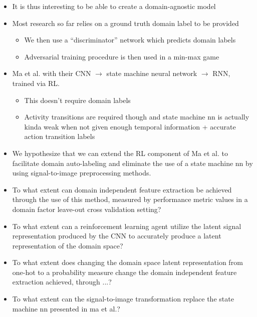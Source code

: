 \begin{itemize}
	\item It is thus interesting to be able to create a domain-agnostic model
	\item Most research so far relies on a ground truth domain label to be provided
	\begin{itemize}
		\item We then use a ``discriminator'' network which predicts domain labels
		\item Adversarial training procedure is then used in a min-max game 
	\end{itemize}
	\item Ma et al. with their CNN $\rightarrow$ state machine neural network $\rightarrow$ RNN, trained via RL.
	\begin{itemize}
		\item This doesn't require domain labels
		\item Activity transitions are required though and state machine nn is actually kinda weak when not given enough temporal information + accurate action transition labels
	\end{itemize}
	\item We hypothesize that we can extend the RL component of Ma et al. to facilitate domain auto-labeling and eliminate the use of a state machine nn by using signal-to-image preprocessing methods.
	\item To what extent can domain independent feature extraction be achieved through the use of this method, measured by performance metric values in a domain factor leave-out cross validation setting?
	\item To what extent can a reinforcement learning agent utilize the latent signal representation produced by the CNN to accurately produce a latent representation of the domain space?
	\item To what extent does changing the domain space latent representation from one-hot to a probability measure change the domain independent feature extraction achieved, through ...?
	\item To what extent can the signal-to-image transformation replace the state machine nn presented in ma et al.?
\end{itemize}


